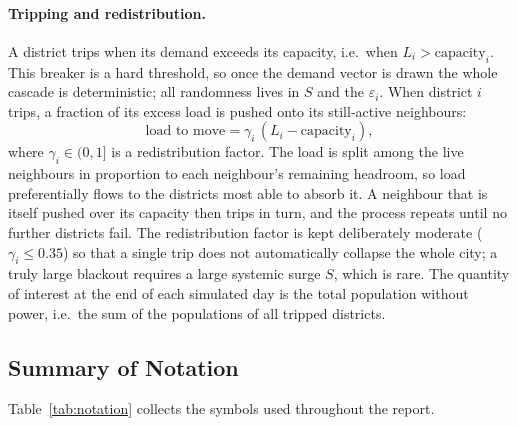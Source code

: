 \documentclass[11pt,a4paper]{article}
\begin{document}
\paragraph{Tripping and redistribution.}
A district trips when its demand exceeds its capacity, i.e.\ when
$L_i > \text{capacity}_i$. This breaker is a hard threshold, so once the demand
vector is drawn the whole cascade is deterministic; all randomness lives in $S$
and the $\varepsilon_i$. When district $i$ trips, a fraction of its excess load is
pushed onto its still-active neighbours:
\begin{equation}
    \text{load to move} = \gamma_i \,(L_i - \text{capacity}_i),
\end{equation}
where $\gamma_i \in (0,1]$ is a redistribution factor. The load is split among
the live neighbours in proportion to each neighbour's remaining headroom, so
load preferentially flows to the districts most able to absorb it. A neighbour
that is itself pushed over its capacity then trips in turn, and the process
repeats until no further districts fail. The redistribution factor is kept
deliberately moderate ($\gamma_i \le 0.35$) so that a single trip does not
automatically collapse the whole city; a truly large blackout requires a large
systemic surge $S$, which is rare. The quantity of interest at the end of each
simulated day is the total population without power, i.e.\ the sum of
the populations of all tripped districts.

\subsection{Summary of Notation}

Table~\ref{tab:notation} collects the symbols used throughout the report.
\end{document}
